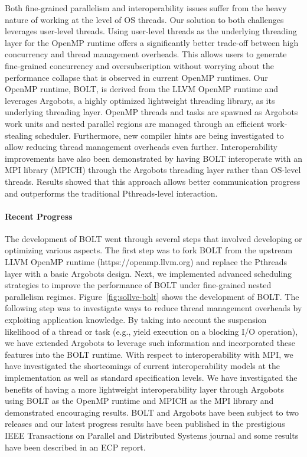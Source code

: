 Both fine-grained parallelism and interoperability issues suffer from
the heavy nature of working at the level of OS threads.  Our solution
to both challenges leverages user-level threads.  Using user-level
threads as the underlying threading layer for the OpenMP runtime
offers a significantly better trade-off between high concurrency and
thread management overheads.  This allows users to generate
fine-grained concurrency and oversubscription without worrying about
the performance collapse that is observed in current OpenMP runtimes.
Our OpenMP runtime, BOLT, is derived from the LLVM OpenMP runtime and
leverages Argobots, a highly optimized lightweight threading library,
as its underlying threading layer.  OpenMP threads and tasks are
spawned as Argobots work units and nested parallel regions are managed
through an efficient work-stealing scheduler.  Furthermore, new
compiler hints are being investigated to allow reducing thread
management overheads even further.  Interoperability improvements have
also been demonstrated by having BOLT interoperate with an MPI library
(MPICH) through the Argobots threading layer rather than OS-level
threads.  Results showed that this approach allows better
communication progress and outperforms the traditional Pthreads-level
interaction.

\paragraph{Recent Progress}

The development of BOLT went through several steps that involved
developing or optimizing various aspects.  The first step was to fork
BOLT from the upstream LLVM OpenMP runtime (https://openmp.llvm.org)
and replace the Pthreads layer with a basic Argobots design.  Next, we
implemented advanced scheduling strategies to improve the performance
of BOLT under fine-grained nested parallelism regimes.
Figure~\ref{fig:sollve-bolt} shows the development of BOLT.  The
following step was to investigate ways to reduce thread management
overheads by exploiting application knowledge.  By taking into account
the suspension likelihood of a thread or task (e.g., yield execution
on a blocking I/O operation), we have extended Argobots to leverage
such information and incorporated these features into the BOLT
runtime.  With respect to interoperability with MPI, we have
investigated the shortcomings of current interoperability models at
the implementation as well as standard specification levels.  We have
investigated the benefits of having a more lightweight
interoperability layer through Argobots using BOLT as the OpenMP
runtime and MPICH as the MPI library and demonstrated encouraging
results.  BOLT and Argobots have been subject to two releases and our
latest progress results have been published in the prestigious IEEE
Transactions on Parallel and Distributed Systems journal and some
results have been described in an ECP report.

